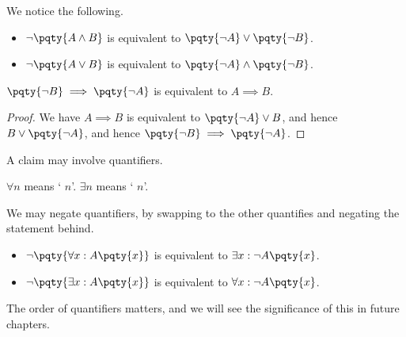 We notice the following.

\begin{proposition}
    \begin{itemize}
        \item \(\lnot \pqty{A \land B}\) is equivalent to \(\pqty{\lnot A} \lor \pqty{\lnot B}\).
        \item \(\lnot \pqty{A \lor B}\) is equivalent to \(\pqty{\lnot A} \land \pqty{\lnot B}\).
    \end{itemize}
\end{proposition}

\begin{proposition}
    \(\pqty{\lnot B} \implies \pqty{\lnot A}\) is equivalent to \(A \implies B\).
\end{proposition}

\begin{proof}
    We have \(A \implies B\) is equivalent to \(\pqty{\lnot A} \lor B\), and hence \(B \lor \pqty{\lnot A}\), and hence \(\pqty{\lnot B} \implies \pqty{\lnot A}\).
\end{proof}

A claim may involve quantifiers.

\begin{definition}
    \(\forall n\) means ` \(n\)'. \(\exists n\) means ` \(n\)'.
\end{definition}

We may negate quantifiers, by swapping to the other quantifies and negating the statement behind.

\begin{proposition}
    \begin{itemize}
        \item \(\lnot \pqty{\forall x: A\pqty{x}}\) is equivalent to \(\exists x: \lnot A\pqty{x}\).
        \item \(\lnot \pqty{\exists x: A\pqty{x}}\) is equivalent to \(\forall x: \lnot A\pqty{x}\).
    \end{itemize}
\end{proposition}

The order of quantifiers matters, and we will see the significance of this in future chapters.